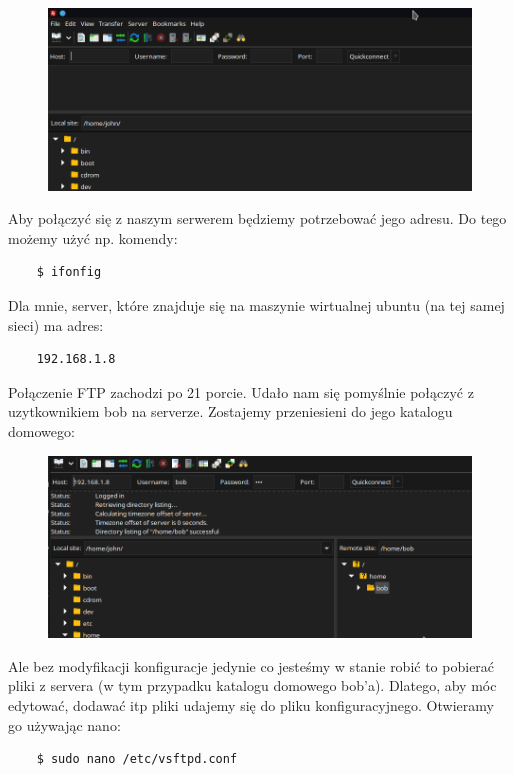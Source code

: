 \documentclass{article}
\begin{document}
\begin{figure}
    \includegraphics[scale=0.5]{zilla.png}
    \centering
\end{figure}

Aby połączyć się z naszym serwerem będziemy potrzebować jego adresu. Do tego możemy użyć np. komendy:
\begin{lstlisting}
    $ ifonfig
\end{lstlisting}
Dla mnie, server, które znajduje się na maszynie wirtualnej ubuntu (na tej samej sieci) ma adres:
\begin{lstlisting}
    192.168.1.8
\end{lstlisting}
Połączenie FTP zachodzi po 21 porcie.
Udało nam się pomyślnie połączyć z uzytkownikiem bob na serverze. Zostajemy przeniesieni do jego katalogu domowego:
\begin{figure}[h!]
    \includegraphics[scale=0.5]{bobzilla.png}
    \centering
\end{figure}
\newpage

Ale bez modyfikacji konfiguracje jedynie co jesteśmy w stanie robić to pobierać pliki z servera (w tym przypadku katalogu domowego bob'a). Dlatego, aby móc edytować, dodawać itp pliki udajemy się do pliku konfiguracyjnego. Otwieramy go używając nano:
\begin{lstlisting}
    $ sudo nano /etc/vsftpd.conf
\end{lstlisting}
\end{document}
